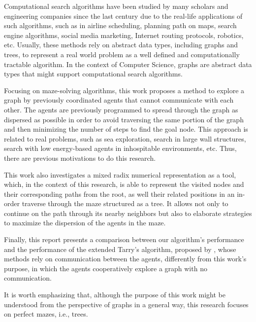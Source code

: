 Computational search algorithms have been studied by many scholars and engineering companies since the last century due to the real-life applications of such algorithms, such as in airline scheduling, planning path on maps, search engine algorithms, social media marketing, Internet routing protocols, robotics, etc. Usually, these methods rely on abstract data types, including graphs and trees, to represent a real world problem as a well defined and computationally tractable algorithm. In the context of Computer Science, graphs are abstract data types that might support computational search algorithms.

Focusing on maze-solving algorithms, this work proposes a method to explore a graph by previously coordinated agents that cannot communicate with each other. The agents are previously programmed to spread through the graph as dispersed as possible in order to avoid traversing the same portion of the graph and then minimizing the number of steps to find the goal node. This approach is related to real problems, such as sea exploration, search in large wall structures, search with low energy-based agents in inhospitable environments, etc. Thus, there are previous motivations to do this research.

This work also investigates a mixed radix numerical representation as a tool, which, in the context of this research, is able to represent the visited nodes and their corresponding paths from the root, as well their related positions in an in-order traverse through the maze structured as a tree. It allows not only to continue on the path through its nearby neighbors but also to elaborate strategies to maximize the dispersion of the agents in the maze.

Finally, this report presents a comparison between our algorithm's performance and the performance of the extended Tarry's algorithm, proposed by , whose methods rely on communication between the agents, differently from this work's purpose, in which the agents cooperatively explore a graph with no communication.

It is worth emphasizing that, although the purpose of this work might be understood from the perspective of graphs in a general way, this research focuses on perfect mazes, i.e., trees.
